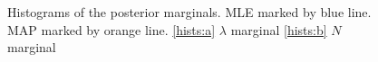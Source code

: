 \documentclass{report}
\theoremstyle{definition}
\begin{document}
\begin{figure}[H]
  \centering
  \centering
  \centering
  \caption{Histograms of the posterior marginals. MLE marked by blue line. MAP marked by orange line. \ref{hists:a} $\lambda$ marginal \ref{hists:b} $N$ marginal}
  \label{fig:hists}
\end{figure}
\end{document}
